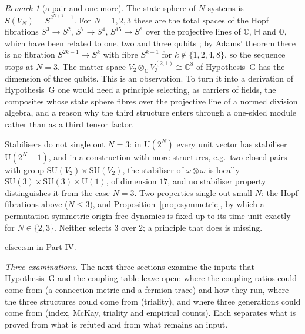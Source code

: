 \documentclass[aps,pra,onecolumn,superscriptaddress,nofootinbib,10pt]{revtex4-2}
\theoremstyle{definition}
\theoremstyle{remark}
\newtheorem{remark}[theorem]{Remark}
\newcommand{\C}{\mathbb{C}}
\newcommand{\HH}{\mathbb{H}}
\newcommand{\SU}{\mathrm{SU}}
\newcommand{\U}{\mathrm{U}}
\begin{document}
\begin{remark}[a pair and one more]\label{rem:hopf}
The state sphere of $N$ systems is $S(V_N)=S^{2^{N+1}-1}$.  For $N=1,2,3$ these are the total spaces of
the Hopf fibrations $S^3\to S^2$, $S^7\to S^4$, $S^{15}\to S^8$ over the projective lines of $\C$, $\HH$ and
$\mathbb O$, which have been related to one, two and three qubits \cite{MD,BC}; by Adams' theorem
\cite{Adams} there is no fibration $S^{2k-1}\to S^k$ with fibre $S^{k-1}$ for $k\notin\{1,2,4,8\}$, so the
sequence stops at $N=3$.  The matter space $V_2\otimes_\C V_3^{(2,1)}\cong\C^8$ of Hypothesis~G has the
dimension of three qubits.  This is an observation.  To turn it into a derivation of Hypothesis~G one
would need a principle selecting, as carriers of fields, the composites whose state sphere fibres over
the projective line of a normed division algebra, and a reason why the third structure enters through
a one-sided module rather than as a third tensor factor.

Stabilisers do not single out $N=3$: in $\U(2^N)$ every unit vector has stabiliser $\U(2^N-1)$, and in
a construction with more structures, e.g.\ two closed pairs with group $\SU(V_2)\times\SU(V_2)$, the
stabiliser of $\omega\otimes\omega$ is locally $\SU(3)\times\SU(3)\times\U(1)$, of dimension $17$, and no
stabiliser property distinguishes it from the case $N=3$.  Two properties single out small $N$: the Hopf fibrations above ($N\le3$), and
Proposition~\ref{prop:symmetric}, by which a permutation-symmetric origin-free dynamics is fixed up to
its time unit exactly for $N\in\{2,3\}$.  Neither selects $3$ over $2$; a principle that does is missing.
\end{remark}


ef{sec:sm} in Part IV.

\smallskip\noindent\emph{Three examinations.}  The next three sections examine the inputs that Hypothesis~G and
the coupling table leave open: where the coupling ratios could come from (a connection metric and a fermion
trace) and how they run, where the three structures could come from (triality), and where three generations
could come from (index, McKay, triality and empirical counts).  Each separates what is proved from what is
refuted and from what remains an input.

\end{document}
